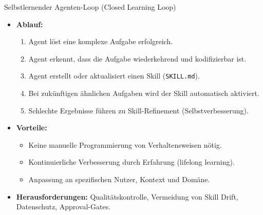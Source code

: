 \documentclass[aspectratio=1610, xcolor=dvipsnames, 9pt]{beamer}
\begin{document}
\begin{frame}{Selbstlernender Agenten-Loop (Closed Learning Loop)}
  \begin{itemize}
    \item \textbf{Ablauf:}
      \begin{enumerate}
        \item Agent löst eine komplexe Aufgabe erfolgreich.
        \item Agent erkennt, dass die Aufgabe wiederkehrend und kodifizierbar ist.
        \item Agent erstellt oder aktualisiert einen Skill (\texttt{SKILL.md}).
        \item Bei zukünftigen ähnlichen Aufgaben wird der Skill automatisch aktiviert.
        \item Schlechte Ergebnisse führen zu Skill-Refinement (Selbstverbesserung).
      \end{enumerate}
    \vspace{0.3cm}
    \item \textbf{Vorteile:}
      \begin{itemize}
        \item Keine manuelle Programmierung von Verhaltensweisen nötig.
        \item Kontinuierliche Verbesserung durch Erfahrung (lifelong learning).
        \item Anpassung an spezifischen Nutzer, Kontext und Domäne.
      \end{itemize}
    \item \textbf{Herausforderungen:} Qualitätskontrolle, Vermeidung von Skill Drift, Datenschutz, Approval-Gates.
  \end{itemize}
\end{frame}
\end{document}

